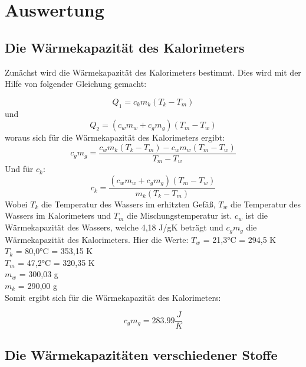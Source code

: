 \section{Auswertung}
\label{sec:Auswertung}

\subsection{Die Wärmekapazität des Kalorimeters}

Zunächst wird die Wärmekapazität des Kalorimeters bestimmt. Dies wird mit der Hilfe von folgender Gleichung gemacht:

\begin{equation}
    Q_1 = c_km_k(T_k-T_m)
\end{equation}
und 
\begin{equation}
    Q_2 = (c_wm_w+c_gm_g)(T_m-T_w)
\end{equation}
woraus sich für die Wärmekapazität des Kalorimeters ergibt:
\begin{equation}
    c_gm_g = \frac{c_wm_k(T_k-T_m)-c_wm_w(T_m-T_w)}{T_m-T_w}
    \label{eq:cgmg}
\end{equation}
Und für \(c_k\):
\begin{equation}
    c_k = \frac{(c_wm_w+c_gm_g)(T_m-T_w)}{m_k(T_k-T_m)}
    \label{eq:ck}
\end{equation}
Wobei \(T_k\) die Temperatur des Wassers im erhitzten Gefäß, \(T_w\) die Temperatur des Wassers im Kalorimeters und \(T_m\) die Mischungstemperatur ist. \(c_w\) ist die Wärmekapazität des Wassers, welche 4,18 J/gK beträgt und \(c_gm_g\) die Wärmekapazität des Kalorimeters.
Hier die Werte:
\(T_w\) = 21,3°C = 294,5 K\\
\(T_k\) = 80,0°C = 353,15 K\\
\(T_m\) = 47,2°C = 320,35 K\\
\(m_w\) = 300,03 g\\
\(m_k\) = 290,00 g\\

Somit ergibt sich für die Wärmekapazität des Kalorimeters:

\begin{equation}
    c_gm_g = 283.99 \frac{J}{K}
\end{equation}

\subsection{Die Wärmekapazitäten verschiedener Stoffe}

